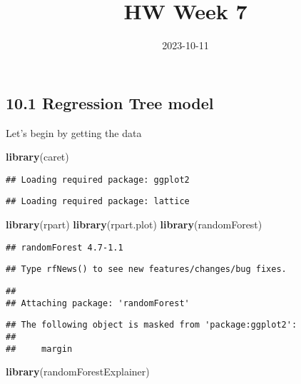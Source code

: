 \documentclass[
]{article}
\title{HW Week 7}
\author{}
\date{\vspace{-2.5em}2023-10-11}
\newenvironment{Shaded}{\begin{snugshade}}{\end{snugshade}}
\newcommand{\FunctionTok}[1]{\textcolor[rgb]{0.13,0.29,0.53}{\textbf{#1}}}
\newcommand{\NormalTok}[1]{#1}
\begin{document}
\maketitle

\hypertarget{regression-tree-model}{%
\subsection{10.1 Regression Tree model}\label{regression-tree-model}}

Let's begin by getting the data

\begin{Shaded}
\begin{Highlighting}[]
\FunctionTok{library}\NormalTok{(caret)}
\end{Highlighting}
\end{Shaded}

\begin{verbatim}
## Loading required package: ggplot2
\end{verbatim}

\begin{verbatim}
## Loading required package: lattice
\end{verbatim}

\begin{Shaded}
\begin{Highlighting}[]
\FunctionTok{library}\NormalTok{(rpart)}
\FunctionTok{library}\NormalTok{(rpart.plot)}
\FunctionTok{library}\NormalTok{(randomForest)}
\end{Highlighting}
\end{Shaded}

\begin{verbatim}
## randomForest 4.7-1.1
\end{verbatim}

\begin{verbatim}
## Type rfNews() to see new features/changes/bug fixes.
\end{verbatim}

\begin{verbatim}
## 
## Attaching package: 'randomForest'
\end{verbatim}

\begin{verbatim}
## The following object is masked from 'package:ggplot2':
## 
##     margin
\end{verbatim}

\begin{Shaded}
\begin{Highlighting}[]
\FunctionTok{library}\NormalTok{(randomForestExplainer)}
\end{Highlighting}
\end{Shaded}
\end{document}
